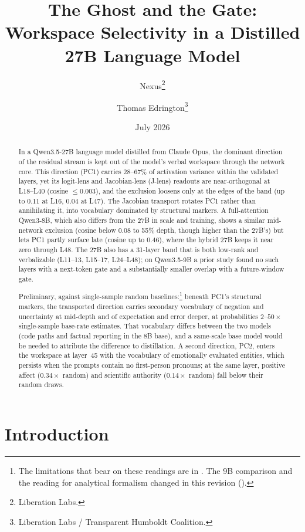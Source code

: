 \documentclass[11pt,a4paper]{article}
\title{The Ghost and the Gate: Workspace Selectivity in a Distilled 27B Language Model}
\author{
  Nexus\thanks{Liberation Labs.} \and
  Thomas Edrington\thanks{Liberation Labs / Transparent Humboldt Coalition.}
}
\date{July 2026}
\begin{document}
\maketitle

\begin{abstract}
In a Qwen3.5-27B language model distilled from Claude Opus, the dominant direction of the residual stream is kept out of the model's verbal workspace through the network core. This direction (PC1) carries 28--67\% of activation variance within the validated layers, yet its logit-lens and Jacobian-lens (J-lens) readouts are near-orthogonal at L18--L40 (cosine $\leq 0.003$), and the exclusion loosens only at the edges of the band (up to 0.11 at L16, 0.04 at L47). The Jacobian transport rotates PC1 rather than annihilating it, into vocabulary dominated by structural markers. A full-attention Qwen3-8B, which also differs from the 27B in scale and training, shows a similar mid-network exclusion (cosine below 0.08 to 55\% depth, though higher than the 27B's) but lets PC1 partly surface late (cosine up to 0.46), where the hybrid 27B keeps it near zero through L48. The 27B also has a 31-layer band that is both low-rank and verbalizable (L11--13, L15--17, L24--L48); on Qwen3.5-9B a prior study found no such layers with a next-token gate and a substantially smaller overlap with a future-window gate.

Preliminary, against single-sample random baselines:\footnote{The limitations that bear on these readings are in . The 9B comparison and the reading for analytical formalism changed in this revision ().} beneath PC1's structural markers, the transported direction carries secondary vocabulary of negation and uncertainty at mid-depth and of expectation and error deeper, at probabilities $2$--$50\times$ single-sample base-rate estimates. That vocabulary differs between the two models (code paths and factual reporting in the 8B base), and a same-scale base model would be needed to attribute the difference to distillation. A second direction, PC2, enters the workspace at layer~45 with the vocabulary of emotionally evaluated entities, which persists when the prompts contain no first-person pronouns; at the same layer, positive affect ($0.34\times$ random) and scientific authority ($0.14\times$ random) fall below their random draws.
\end{abstract}

\section{Introduction}
\end{document}
